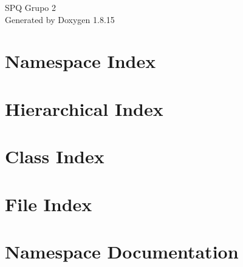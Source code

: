 \let\mypdfximage\pdfximage\def\pdfximage{\immediate\mypdfximage}\documentclass[twoside]{book}
\newcommand{\+}{\discretionary{\mbox{\scriptsize$\hookleftarrow$}}{}{}}
\newcommand{\clearemptydoublepage}{%
  \newpage{\pagestyle{empty}\cleardoublepage}%
}
\begin{document}
\hypersetup{pageanchor=false,
             bookmarksnumbered=true,
             pdfencoding=unicode
            }
\begin{titlepage}
\vspace*{7cm}
\begin{center}%
{\Large S\+PQ Grupo 2 }\\
\vspace*{1cm}
{\large Generated by Doxygen 1.8.15}\\
\end{center}
\end{titlepage}
\clearemptydoublepage
{}
\tableofcontents
\clearemptydoublepage
{}
\hypersetup{pageanchor=true}

\chapter{Namespace Index}

\chapter{Hierarchical Index}

\chapter{Class Index}

\chapter{File Index}

\chapter{Namespace Documentation}






\end{document}
